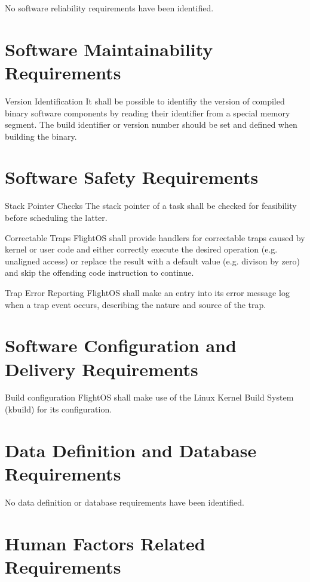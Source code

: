No software reliability requirements have been identified.

\section{Software Maintainability Requirements}

 {Version Identification}{%
It shall be possible to identifiy the version of compiled binary software
components by reading their identifier from a special memory segment.
}{
The build identifier or version number should be set and defined when building
the binary.
}%


\section{Software Safety Requirements}

 {Stack Pointer Checks}{%
The stack pointer of a task shall be checked for feasibility before scheduling
the latter.
}{
}%

 {Correctable Traps}{%
FlightOS shall provide handlers for correctable traps caused by kernel or user
code and either correctly execute the desired operation (e.g. unaligned access)
or replace the result with a default value (e.g. divison by zero) and skip the
offending code instruction to continue.
}{
}

 {Trap Error Reporting}{%
FlightOS shall make an entry into its error message log when a trap event occurs,
describing the nature and source of the trap.
}{
}



\section{Software Configuration and Delivery Requirements}

 {Build configuration}{%
FlightOS shall make use of the Linux Kernel Build System (kbuild) for its
configuration.
}{}%


\section{Data Definition and Database Requirements}

No data definition or database requirements have been identified.


\section{Human Factors Related Requirements}

